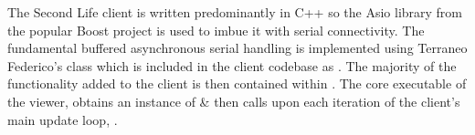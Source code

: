 \newcommand{\megaregionFootnote}{\footnote{\url{http://opensimulator.org/wiki/Setting_Up_Mega-Regions}}}



The Second Life client is written predominantly in C++ so the Asio library\asioFootnote{} from the popular Boost project\boostFootnote{} is used to imbue it with serial connectivity. The fundamental buffered asynchronous serial handling is implemented using Terraneo Federico's  class\fedetftFootnote{} which is included in the client codebase as . The majority of the functionality added to the client is then contained within . The core executable of the viewer,  obtains an instance of  \& then calls  upon each iteration of the client's main update loop, .


